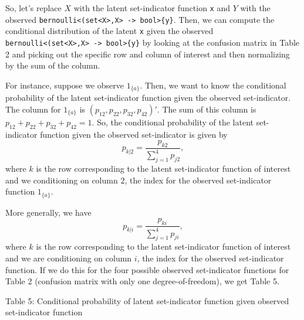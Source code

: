 \documentclass[
]{article}
\begin{document}
So, let's replace \(X\) with the latent set-indicator function
\texttt{x} and \(Y\) with the observed
\texttt{bernoulli\textless{}(set\textless{}X\textgreater{},X\textgreater{}\ -\textgreater{}\ bool\textgreater{}\{y\}}.
Then, we can compute the conditional distribution of the latent
\texttt{x} given the observed
\texttt{bernoulli\textless{}(set\textless{}X\textgreater{},X\textgreater{}\ -\textgreater{}\ bool\textgreater{}\{y\}}
by looking at the confusion matrix in Table 2 and picking out the
specific row and column of interest and then normalizing by the sum of
the column.

For instance, suppose we observe \(1_{\{a\}}\). Then, we want to know
the conditional probability of the latent set-indicator function given
the observed set-indicator. The column for \(1_{\{a\}}\) is
\((p_{1 2}, p_{2 2}, p_{3 2}, p_{4 2})'\). The sum of this column is
\(p_{1 2} + p_{2 2} + p_{3 2} + p_{4 2} = 1\). So, the conditional
probability of the latent set-indicator function given the observed
set-indicator is given by \[
p_{k|2} = \frac{p_{k 2}}{\sum_{j=1}^4 p_{j 2}},
\] where \(k\) is the row corresponding to the latent set-indicator
function of interest and we conditioning on column \(2\), the index for
the observed set-indicator function \(1_{\{a\}}\).

More generally, we have \[
p_{k|i} = \frac{p_{k i}}{\sum_{j=1}^4 p_{j i}},
\] where \(k\) is the row corresponding to the latent set-indicator
function of interest and we are conditioning on column \(i\), the index
for the observed set-indicator function. If we do this for the four
possible observed set-indicator functions for Table 2 (confusion matrix
with only one degree-of-freedom), we get Table 5.

Table 5: Conditional probability of latent set-indicator function given
observed set-indicator function
\end{document}
